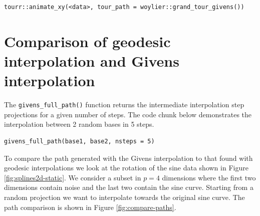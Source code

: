 \begin{verbatim}
tourr::animate_xy(<data>, tour_path = woylier::grand_tour_givens())
\end{verbatim}

\hypertarget{comparison-of-geodesic-interpolation-and-givens-interpolation}{%
\section{Comparison of geodesic interpolation and Givens interpolation}\label{comparison-of-geodesic-interpolation-and-givens-interpolation}}

The \texttt{givens\_full\_path()} function returns the intermediate interpolation step projections for a given number of steps. The code chunk below demonstrates the interpolation between 2 random bases in 5 steps.

\begin{verbatim}
givens_full_path(base1, base2, nsteps = 5)
\end{verbatim}

To compare the path generated with the Givens interpolation to that found with geodesic interpolations we look at the rotation of the sine data shown in Figure \ref{fig:splines2d-static}. We consider a subset in \(p=4\) dimensions where the first two dimensions contain noise and the last two contain the sine curve. Starting from a random projection we want to interpolate towards the original sine curve. The path comparison is shown in Figure \ref{fig:compare-paths}.

